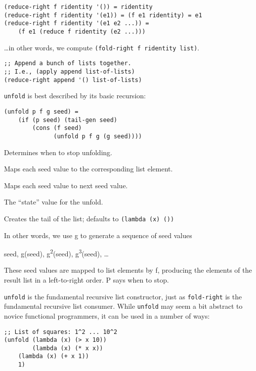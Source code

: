 \begin{description}
\begin{verbatim}
(reduce-right f ridentity '()) = ridentity
(reduce-right f ridentity '(e1)) = (f e1 ridentity) = e1
(reduce-right f ridentity '(e1 e2 ...)) =
    (f e1 (reduce f ridentity (e2 ...)))
\end{verbatim}

\ldots{}in other words, we compute
\texttt{(fold-right\ f\ ridentity\ list)}.

\begin{verbatim}
;; Append a bunch of lists together.
;; I.e., (apply append list-of-lists)
(reduce-right append '() list-of-lists)
\end{verbatim}
\item[ \href{}{} \texttt{unfold} p f g seed {[}tail-gen{]}
-\textgreater{} list ]
\texttt{unfold} is best described by its basic recursion:

\begin{verbatim}
(unfold p f g seed) = 
    (if (p seed) (tail-gen seed)
        (cons (f seed)
              (unfold p f g (g seed))))
\end{verbatim}

\begin{description}
\tightlist
\item[ p ]
Determines when to stop unfolding.
\item[ f ]
Maps each seed value to the corresponding list element.
\item[ g ]
Maps each seed value to next seed value.
\item[ seed ]
The ``state'' value for the unfold.
\item[ tail-gen ]
Creates the tail of the list; defaults to
\texttt{(lambda\ (x)\ \textquotesingle{}())}
\end{description}

In other words, we use g to generate a sequence of seed values

seed, g(seed), g\textsuperscript{2}(seed), g\textsuperscript{3}(seed),
\ldots{}

These seed values are mapped to list elements by f, producing the
elements of the result list in a left-to-right order. P says when to
stop.

\texttt{unfold} is the fundamental recursive list constructor, just as
\texttt{fold-right} is the fundamental recursive list consumer. While
\texttt{unfold} may seem a bit abstract to novice functional
programmers, it can be used in a number of ways:

\begin{verbatim}
;; List of squares: 1^2 ... 10^2
(unfold (lambda (x) (> x 10))
        (lambda (x) (* x x))
    (lambda (x) (+ x 1))
    1)
        

\end{verbatim}
\end{description}
